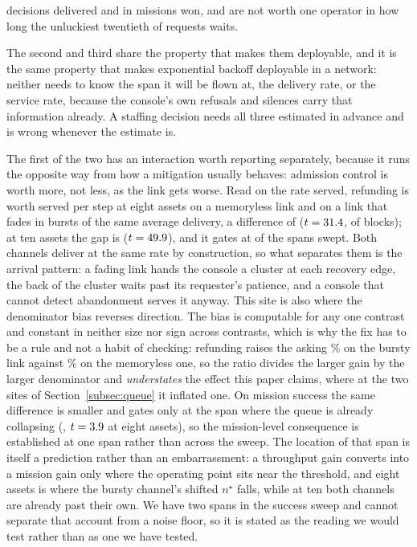 \documentclass[11pt]{article}
\begin{document}
decisions delivered and in missions won, and are not worth one operator in how long the unluckiest twentieth of requests waits.

The second and third share the property that makes them deployable, and it is the same property that makes exponential backoff deployable in a network: neither needs to know the span it will be flown at, the delivery rate, or the service rate, because the console's own refusals and silences carry that information already. A staffing decision needs all three estimated in advance and is wrong whenever the estimate is.

The first of the two has an interaction worth reporting separately, because it runs the opposite way from how a mitigation usually behaves: admission control is worth more, not less, as the link gets worse. Read on the rate served, refunding is worth \grNEightBern{} served per step at eight assets on a memoryless link and \grNEightGe{} on a link that fades in bursts of the same average delivery, a difference of \grNEightDid{} ($t = 31.4{}$, \grBlocks{} of \grBlocks{} blocks); at ten assets the gap is \grNTenDid{} ($t = 49.9{}$), and it gates at \grGated{} of the \grSpans{} spans swept. Both channels deliver at the same rate by construction, so what separates them is the arrival pattern: a fading link hands the console a cluster at each recovery edge, the back of the cluster waits past its requester's patience, and a console that cannot detect abandonment serves it anyway. This site is also where the denominator bias reverses direction. The bias is computable for any one contrast and constant in neither size nor sign across contrasts, which is why the fix has to be a rule and not a habit of checking: refunding raises the asking \grNTenGeAsk\% on the bursty link against \grNTenBernAsk\% on the memoryless one, so the ratio divides the larger gain by the larger denominator and \emph{understates} the effect this paper claims, where at the two sites of Section~\ref{subsec:queue} it inflated one. On mission success the same difference is smaller and gates only at the span where the queue is already collapsing (\buDidSuccEight{}, $t = 3.9{}$ at eight assets), so the mission-level consequence is established at one span rather than across the sweep. The location of that span is itself a prediction rather than an embarrassment: a throughput gain converts into a mission gain only where the operating point sits near the threshold, and eight assets is where the bursty channel's shifted $n^{\star}$ falls, while at ten both channels are already past their own. We have two spans in the success sweep and cannot separate that account from a noise floor, so it is stated as the reading we would test rather than as one we have tested.
\end{document}
